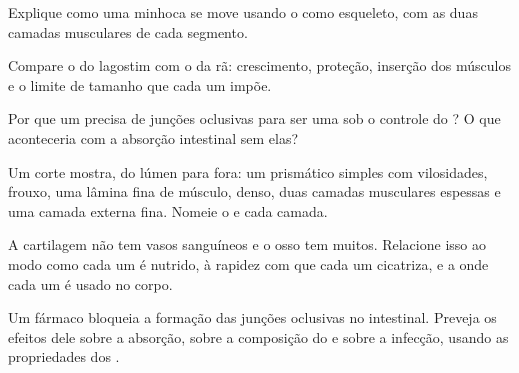 \begin{exercise}[$\star\star$]\label{exo:b1:body-plans-tissues:6}
Explique como uma minhoca se move usando o  como esqueleto, com as
duas camadas musculares de cada segmento.
\end{exercise}

\begin{exercise}[$\star\star$]\label{exo:b1:body-plans-tissues:7}
Compare o  do lagostim com o  da rã:
crescimento, proteção, inserção dos músculos e o limite de tamanho que
cada um impõe.
\end{exercise}

\begin{exercise}[$\star\star$]\label{exo:b1:body-plans-tissues:8}
Por que um  precisa de junções oclusivas para ser uma  sob o controle do ? O que aconteceria com a absorção
intestinal sem elas?
\end{exercise}

\begin{exercise}[$\star\star$]\label{exo:b1:body-plans-tissues:9}
Um corte mostra, do lúmen para fora: um  prismático simples com
vilosidades,  frouxo, uma lâmina fina de músculo,
 denso, duas camadas musculares espessas e uma camada
externa fina. Nomeie o  e cada camada.
\end{exercise}

\begin{exercise}[$\star\star\star$]\label{exo:b1:body-plans-tissues:10}
A cartilagem não tem vasos sanguíneos e o osso tem muitos. Relacione
isso ao modo como cada um é nutrido, à rapidez com que cada um
cicatriza, e a onde cada um é usado no corpo.
\end{exercise}

\begin{exercise}[$\star\star\star$]\label{exo:b1:body-plans-tissues:11}
Um fármaco bloqueia a formação das junções oclusivas no 
intestinal. Preveja os efeitos dele sobre a absorção, sobre a composição
do  e sobre a infecção, usando as propriedades dos
.
\end{exercise}


